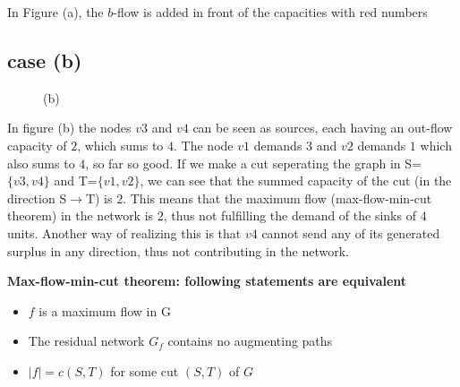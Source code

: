 In Figure (a), the $b$-flow is added in front of the capacities with red numbers


\subsection{case (b)}

\begin{figure}[h]
    \centering
    \caption{(b)}
    \label{fig:ex1b}
\end{figure}

In figure (b) the nodes $v3$ and $v4$ can be seen as sources, each having an out-flow capacity of $2$, which sums to $4$. The node $v1$ demands $3$ and $v2$ demands $1$ which also sums to $4$, so far so good. If we make a cut seperating the graph in S=$\{v3,v4\}$ and T=$\{ v1, v2\}$, we can see that the summed capacity of the cut (in the direction S$\rightarrow$T) is $2$. This means that the maximum flow (max-flow-min-cut theorem) in the network is $2$, thus not fulfilling the demand of the sinks of $4$ units. Another way of realizing this is that $v4$ cannot send any of its generated surplus in any direction, thus not contributing in the network. 


\textbf{Max-flow-min-cut theorem: following statements are equivalent}
\begin{itemize}
  \item $f$ is a maximum flow in G
  \item The residual network $G_f$ contains no augmenting paths
  \item $|f| = c(S,T)$ for some cut $(S,T)$ of $G$
\end{itemize}

\textbf{}
